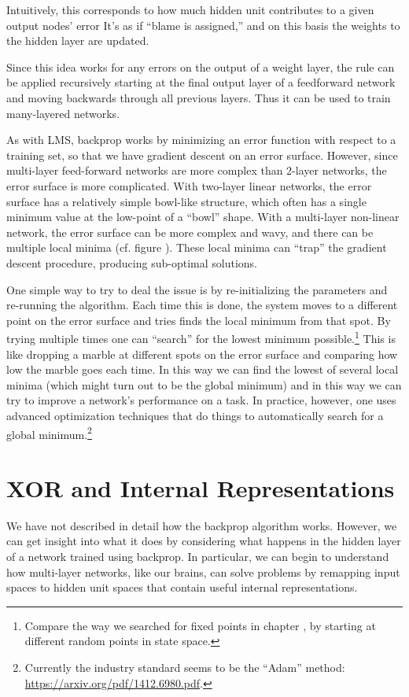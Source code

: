 Intuitively, this corresponds to how much hidden unit contributes to a given output nodes' error  It's as if ``blame is assigned,'' and on this basis the weights to the hidden layer are updated.

Since this idea works for any errors on the output of a weight layer, the rule can be applied recursively starting at the final output layer of a feedforward network and moving backwards through all previous layers. Thus it can be used to train many-layered networks. 

As with LMS, backprop works by minimizing an error function with respect to a training set, so that we have gradient descent on an error surface. However, since multi-layer feed-forward networks are more complex than 2-layer networks, the error surface is more complicated. With two-layer linear networks, the error surface has a relatively simple bowl-like structure, which often has a single minimum value at the low-point of a ``bowl'' shape. With a multi-layer non-linear network, the error surface can be more complex and wavy, and there can be multiple local minima (cf. figure ). These local minima can ``trap'' the gradient descent procedure, producing sub-optimal solutions.

One simple way to try to deal the issue is by re-initializing the parameters and re-running the algorithm. Each time this is done, the system moves to a different point on the error surface and tries finds the local minimum from that spot. By trying multiple times one can ``search'' for the lowest minimum possible.\footnote{Compare the way we searched for fixed points in chapter , by starting at different random points in state space.}  This is like dropping a marble at different spots on the error surface and comparing how low the marble goes each time. In this way we can find the lowest of several local minima (which might turn out to be the global minimum) and in this way we can try to improve a network's performance on a task. In practice, however, one uses advanced optimization techniques that do things to automatically search for a global minimum.\footnote{Currently the industry standard seems to be the ``Adam'' method: \url{https://arxiv.org/pdf/1412.6980.pdf}.}

\section{XOR and Internal Representations}\label{sect_xor_remap}

We have not described in detail how the backprop algorithm works. However, we can get insight into what it does by considering what happens in the hidden layer of a network trained using backprop. In particular, we can begin to understand how multi-layer networks, like our brains, can solve problems by remapping input spaces to hidden unit spaces that contain useful internal representations. 

